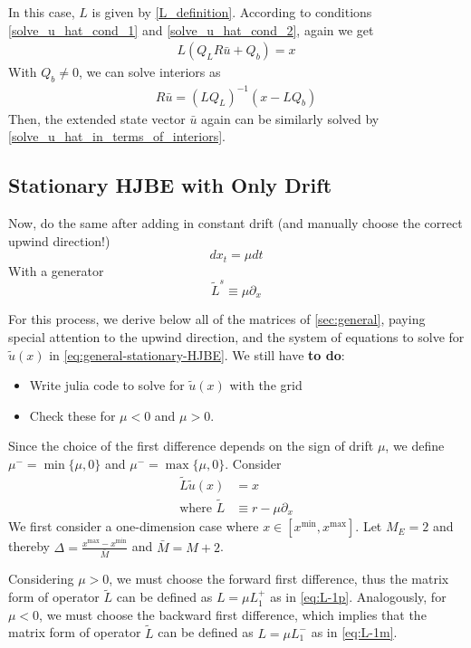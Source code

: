 \documentclass[11pt]{article}
\newcommand{\D}[1][]{\ensuremath{\partial_{#1}}}
\begin{document}
In this case, $L$ is given by \cref{L_definition}. According to conditions \cref{solve_u_hat_cond_1} and \cref{solve_u_hat_cond_2}, again we get
\begin{align}
L(Q_L R \bar{u}+Q_b) = x
\end{align}
With $Q_b\neq 0$, we can solve interiors as
\begin{align}
R\bar{u} = (L Q_L)^{-1}(x-L Q_b)
\end{align}
Then, the extended state vector $\bar{u}$ again can be similarly solved by \cref{solve_u_hat_in_terms_of_interiors}.
\subsection{Stationary HJBE with Only Drift}
Now, do the same after adding in constant drift (and manually choose the correct upwind direction!)
$$
d x_t = \mu dt
$$
With a generator
\begin{equation}
	\tilde{L}^s \equiv \mu \D[x]\label{eq:L-s-drift}
\end{equation}

For this process, we derive below all of the matrices of \cref{sec:general}, paying special attention to the upwind direction, and the system of equations to solve for $\tilde{u}(x)$ in \cref{eq:general-stationary-HJBE}. We still have \textbf{to do}:
\begin{itemize}
	\item Write julia code to solve for $\tilde{u}(x)$ with the grid
	\item Check these for $\mu < 0$ and $\mu > 0$.
\end{itemize}

Since the choice of the first difference depends on the sign of drift $\mu$, we define $\mu^- =\min\{\mu, 0\}$ and $\mu^- =\max\{\mu, 0\}$.
Consider
\begin{align}
\tilde{L} \tilde{u}(x) &= x\label{HJBE_PDE_with_drifts}\\
\text{where }\tilde{L}&\equiv r - \mu\partial_{x}
\end{align}
We first consider a one-dimension case where $x\in [x^{\min},x^{\max}]$. Let $M_E = 2$ and thereby $\Delta  = \frac{x^{\max}-x^{\min}}{\bar{M}}$ and $\bar{M} = M+2$.

Considering $\mu>0$, we must choose the forward first difference, thus the matrix form of operator $\tilde{L}$ can be defined as $L = \mu L_1^+$ as in \cref{eq:L-1p}. Analogously, for $\mu<0$, we must choose the backward first difference, which implies that the matrix form of operator $\tilde{L}$ can be defined as $L = \mu L_1^-$ as in \cref{eq:L-1m}.
\end{document}
